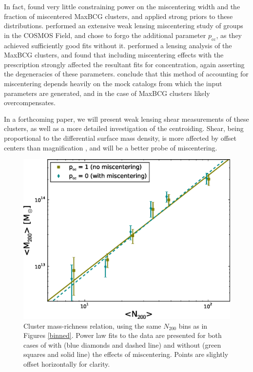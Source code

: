 In fact, \citet{Johnston07} found very little constraining power on the miscentering width and the fraction of miscentered MaxBCG clusters, and applied strong priors to these distributions. \citet{George12} performed an extensive weak lensing miscentering study of groups in the \ac{COSMOS} Field, and chose to forgo the additional parameter $p_{\mathrm{cc}}$, as they achieved sufficiently good fits without it. \citet{Mandelbaum08b} performed a lensing analysis of the MaxBCG clusters, and found that including miscentering effects with the \citet{Johnston07} prescription strongly affected the resultant fits for concentration, again asserting the degeneracies of these parameters. \citet{Mandelbaum08b} conclude that this method of accounting for miscentering depends heavily on the mock catalogs from which the input parameters are generated, and in the case of MaxBCG clusters likely overcompensates. 

In a forthcoming paper, we will present weak lensing shear measurements of these clusters, as well as a more detailed investigation of the centroiding. Shear, being proportional to the differential surface mass density, is more affected by offset centers than magnification \citep{Johnston07}, and will be a better probe of miscentering.




\begin{figure}
\begin{center}
\includegraphics[scale=0.7]{plots_ch3/MassRich_2to1000_U.eps}
\caption[Mass-Richness Relation from Magnification]{Cluster mass-richness relation, using the same $N_{200}$ bins as in Figures \ref{binned}. Power law fits to the data are presented for both cases of with (blue diamonds and dashed line) and without (green squares and solid line) the effects of miscentering. Points are slightly offset horizontally for clarity.}
\label{massrich}
\end{center}
\end{figure}

